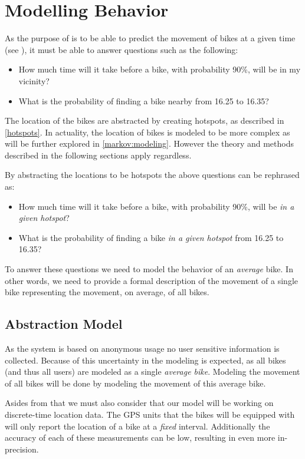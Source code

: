\section{Modelling Behavior}\label{modelbehavior}
As the purpose of \projectname{} is to be able to predict the movement of bikes at a given time (see ), it must be able to answer questions such as the following:
\begin{itemize}
\item How much time will it take before a bike, with probability 90\%, will be in my vicinity?
\item What is the probability of finding a bike nearby from 16.25 to 16.35?
\end{itemize}

The location of the bikes are abstracted by creating hotspots, as described in \cref{hotspots}.
In actuality, the location of bikes is modeled to be more complex as will be further explored in \cref{markov:modeling}.
However the theory and methods described in the following sections apply regardless.

By abstracting the locations to be hotspots the above questions can be rephrased as:

\begin{itemize}
\item How much time will it take before a bike, with probability 90\%, will be \textit{in a given hotspot}?
\item What is the probability of finding a bike \textit{in a given hotspot} from 16.25 to 16.35?
\end{itemize}

To answer these questions we need to model the behavior of an \textit{average} bike.
In other words, we need to provide a formal description of the movement of a single bike representing the movement, on average, of all bikes.

\subsection{Abstraction Model}
As the system is based on anonymous usage no user sensitive information is collected.
Because of this uncertainty in the modeling is expected, as all bikes (and thus all users) are modeled as a single \textit{average bike}.
Modeling the movement of all bikes will be done by modeling the movement of this average bike.

Asides from that we must also consider that our model will be working on discrete-time location data.
The GPS units that the bikes will be equipped with will only report the location of a bike at a \textit{fixed} interval.
Additionally the accuracy of each of these measurements can be low, resulting in even more in-precision.


